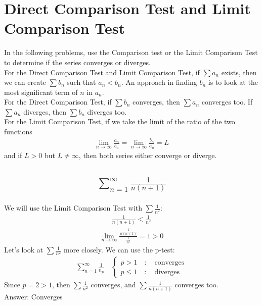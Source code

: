 \documentclass{article}
\begin{document}
\section{Direct Comparison Test and Limit Comparison Test}
In the following problems, use the Comparison test or the Limit Comparison Test to determine if the series converges or diverges. \\[10pt]
For the Direct Comparison Test and Limit Comparison Test, if $\sum a_n$ exists, then we can create $\sum b_n$ such that $a_n < b_n$. An approach in finding $b_n$ is to look at the most significant term of $n$ in $a_n$. \\[10pt]
For the Direct Comparison Test, if $\sum b_n$ converges, then $\sum a_n$ converges too. If $\sum a_n$ diverges, then $\sum b_n$ diverges too. \\[10pt]
For the Limit Comparison Test, if we take the limit of the ratio of the two functions
\begin{align*}
	\lim_{n \to \infty} {\frac{a_n}{b_n}} = \lim_{n \to \infty} \frac{b_n}{a_n} = L
\end{align*}
and if $L > 0$ but $L \neq \infty$, then both series either converge or diverge.
\subsection{
	\begin{align*}
		\sum_{n = 1}^\infty \frac{1}{n(n + 1)}
	\end{align*}
}
We will use the Limit Comparison Test with $\sum \frac{1}{n^2}$:
\begin{align*}
	\frac{1}{n(n + 1)} < \frac{1}{n^2}
\end{align*}
\begin{align*}
	\lim_{n \to \infty} {\frac{\frac{1}{n(n + 1)}}{\frac{1}{n^2}}} = 1 > 0
\end{align*}
Let's look at $\sum \frac{1}{n^2}$ more closely. We can use the p-test: 
\begin{align*}
	\sum_{n = 1}^\infty \frac{1}{n_p} \quad
	\begin{cases}
		p > 1 \quad : \quad \text{converges} \\
		p \leq 1 \quad : \quad \text{diverges}
	\end{cases}
\end{align*}
Since $p = 2 > 1$, then $\sum \frac{1}{n^2}$ converges, and $\sum \frac{1}{n(n + 1)}$ converges too. \\[10pt]
Answer: Converges

\end{document}
